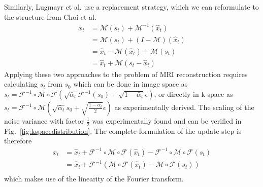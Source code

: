 Similarly, Lugmayr et al. use a replacement strategy, which we can reformulate to the structure from Choi et al.
\begin{align}
    \label{eq:repaint}
    x_{t} & = \mathcal{M}(s_t) + \mathcal{M}^{-1}(\hat{x}_t)        \\
          & = \mathcal{M}(s_t) + (I - \mathcal{M})(\hat{x}_t)       \\
          & = \hat{x}_t - \mathcal{M}(\hat{x}_t) + \mathcal{M}(s_t) \\
          & = \hat{x}_t + \mathcal{M}(s_t - \hat{x}_t)
\end{align}
Applying these two approaches to the problem of MRI reconstruction requires calculating $s_t$ from $s_0$ which can be done in image space as $s_t = \mathcal{F}^{-1} \circ \mathcal{M} \circ \mathcal{F} (\sqrt{\bar{\alpha}_t} \mathcal{F}^{-1}(s_0) + \sqrt{1-\bar{\alpha}_t} \epsilon)$, or directly in k-space as $s_t = \mathcal{F}^{-1} \circ \mathcal{M} (\sqrt{\bar{\alpha}_t} s_0 + \sqrt{\frac{1-\bar{\alpha}_t}{2}} \epsilon)$ as experimentally derived. The scaling of the noise variance with factor $\frac{1}{2}$ was experimentally found and can be verified in Fig.~\ref{fig:kspacedistribution}. The complete formulation of the update step is therefore
\begin{align}
    x_{t} & = \hat{x}_t + \mathcal{F}^{-1}\circ\mathcal{M}\circ\mathcal{F}(\hat{x}_t) - \mathcal{F}^{-1} \circ \mathcal{M} \circ \mathcal{F} (s_t) \\
          & = \hat{x}_t + \mathcal{F}^{-1}\left(\mathcal{M}\circ\mathcal{F}(\hat{x}_t) - \mathcal{M} \circ \mathcal{F} (s_t)\right)                \\
\end{align}
which makes use of the linearity of the Fourier transform.


